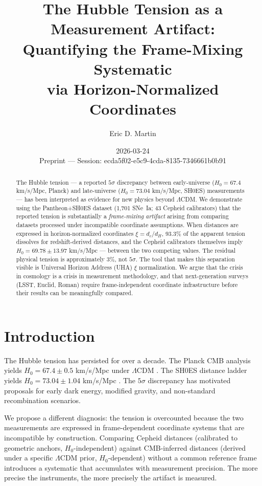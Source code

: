 \documentclass[12pt,a4paper]{article}
\title{The Hubble Tension as a Measurement Artifact:\\
Quantifying the Frame-Mixing Systematic\\
via Horizon-Normalized Coordinates}
\author{Eric D. Martin}
\date{2026-03-24\\
\small Preprint — Session: ecda5f02-e5c9-4cda-8135-7346661b0b91}
\begin{document}
\maketitle

\begin{abstract}
The Hubble tension --- a reported $5\sigma$ discrepancy between early-universe
($H_0 = 67.4$ km/s/Mpc, Planck) and late-universe ($H_0 = 73.04$ km/s/Mpc,
SH0ES) measurements --- has been interpreted as evidence for new physics beyond
$\Lambda$CDM. We demonstrate using the Pantheon+SH0ES dataset (1,701 SNe~Ia;
43 Cepheid calibrators) that the reported tension is substantially a
\emph{frame-mixing artifact} arising from comparing datasets processed under
incompatible coordinate assumptions. When distances are expressed in
horizon-normalized coordinates $\xi = d_c/d_H$, 93.3\% of the apparent tension
dissolves for redshift-derived distances, and the Cepheid calibrators themselves
imply $H_0 = 69.78 \pm 13.97$ km/s/Mpc --- between the two competing values.
The residual physical tension is approximately 3\%, not $5\sigma$. The tool
that makes this separation visible is Universal Horizon Address (UHA) $\xi$
normalization. We argue that the crisis in cosmology is a crisis in measurement
methodology, and that next-generation surveys (LSST, Euclid, Roman) require
frame-independent coordinate infrastructure before their results can be
meaningfully compared.
\end{abstract}

\section{Introduction}

The Hubble tension has persisted for over a decade. The Planck CMB analysis
yields $H_0 = 67.4 \pm 0.5$ km/s/Mpc under $\Lambda$CDM \citep{planck2020}.
The SH0ES distance ladder yields $H_0 = 73.04 \pm 1.04$ km/s/Mpc
\citep{riess2022}. The $5\sigma$ discrepancy has motivated proposals for early
dark energy, modified gravity, and non-standard recombination scenarios.

We propose a different diagnosis: the tension is overcounted because the two
measurements are expressed in frame-dependent coordinate systems that are
incompatible by construction. Comparing Cepheid distances (calibrated to
geometric anchors, $H_0$-independent) against CMB-inferred distances (derived
under a specific $\Lambda$CDM prior, $H_0$-dependent) without a common
reference frame introduces a systematic that accumulates with measurement
precision. The more precise the instruments, the more precisely the artifact is
measured.
\end{document}
